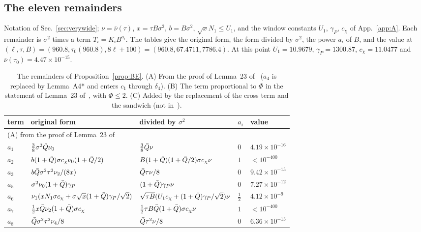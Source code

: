 \subsection{The eleven remainders}

Notation of Sec.~\ref{sec:verywide}; $\nu=\bar\nu(\tau)$, $x=\tau B\sigma^2$, $b=B\sigma^2$, $\sqrt xN_1\le U_1$, and the window constants $U_1$, $\gamma_P$, $c_\chi$ of App.~\ref{app:A}.
Each remainder is $\sigma^2$ times a term $T_i=K_iB^{a_i}$.
The tables give the original form, the form divided by $\sigma^2$, the power $a_i$ of $B$, and the value at $(\ell,\tau,B)=(960.8,\tau_0(960.8),8\ell+100)=(960.8,67.4711,7786.4)$.
At this point $U_1=10.9679$, $\gamma_P=1300.87$, $c_\chi=11.0477$ and $\bar\nu(\tau_0)=4.47\times10^{-15}$.

\begin{table}
\caption{The remainders of Proposition~\ref{prop:BE}. (A) From the proof of Lemma~23 of~\cite{F} ($a_4$ is replaced by Lemma~A4* and enters $c_1$ through $\delta_4$). (B) The term proportional to $\Phi$ in the statement of Lemma~23 of~\cite{F}, with $\Phi\le2$. (C) Added by the replacement of the cross term and the sandwich (not in~\cite{F}).}
\label{tab:rem}
\begin{ruledtabular}
\small
\begin{tabular}{p{}p{}p{}p{}p{}}
term & original form & divided by $\sigma^2$ & $a_i$ & value\\ \hline
\multicolumn{5}{l}{(A) from the proof of Lemma~23 of~\cite{F}}\\
$a_1$ & $\frac38\sigma^2\bar Q\nu_0$ & $\frac38\bar Q\nu$ & $0$ & $4.19\times10^{-16}$\\
$a_2$ & $b(1+\bar Q)\sigma c_\chi\nu_0(1+\bar Q/2)$ & $B(1+\bar Q)(1+\bar Q/2)\sigma c_\chi\nu$ & $1$ & $<10^{-400}$\\
$a_3$ & $b\bar Q\sigma^2\tau^2\nu_2/(8x)$ & $\bar Q\tau\nu/8$ & $0$ & $9.42\times10^{-15}$\\
$a_5$ & $\sigma^2\nu_0(1+\bar Q)\gamma_P$ & $(1+\bar Q)\gamma_P\nu$ & $0$ & $7.27\times10^{-12}$\\
$a_6$ & $\nu_1(xN_1\sigma c_\chi+\sigma\sqrt x(1+\bar Q)\gamma_P/\sqrt2)$ & $\sqrt{\tau B}(U_1c_\chi+(1+\bar Q)\gamma_P/\sqrt2)\nu$ & $\frac12$ & $4.12\times10^{-9}$\\
$a_7$ & $\frac12x\bar Q\nu_2(1+\bar Q)\sigma c_\chi$ & $\frac12\tau B\bar Q(1+\bar Q)\sigma c_\chi\nu$ & $1$ & $<10^{-400}$\\
$a_8$ & $\bar Q\sigma^2\tau^2\nu_4/8$ & $\bar Q\tau^2\nu/8$ & $0$ & $6.36\times10^{-13}$\\

\end{tabular}
\end{ruledtabular}
\end{table}
